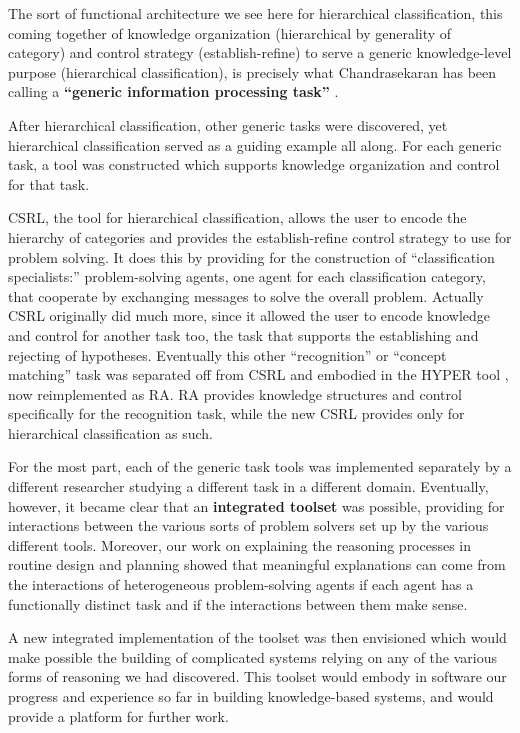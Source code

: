 The sort of functional architecture we see here for hierarchical
classification, this coming together of knowledge organization
(hierarchical by generality of category) and control strategy
(establish-refine) to serve a generic knowledge-level purpose
(hierarchical classification), is precisely what Chandrasekaran has
been calling a {\bf ``generic information processing task''}
\cite{86-BC-IEEEX,87-BC-IJCAI}.

After hierarchical classification, other generic tasks were
discovered, yet hierarchical classification served as a guiding
example all along.  For each generic task, a tool was constructed
which supports knowledge organization and control for that task.

CSRL, the tool for hierarchical classification, allows the user to
encode the hierarchy of categories and provides the establish-refine
control strategy to use for problem solving.  It does this by
providing for the construction of ``classification specialists:''
problem-solving agents, one agent for each classification category,
that cooperate by exchanging messages to solve the overall problem.
Actually CSRL originally did much more, since it allowed the user to
encode knowledge and control for another task too, the task that
supports the establishing and rejecting of hypotheses.  Eventually
this other ``recognition'' or ``concept matching'' task was separated
off from CSRL and embodied in the HYPER tool \cite{Johnson86}, now
reimplemented as RA.  RA provides knowledge structures and control
specifically for the recognition task, while the new CSRL provides
only for hierarchical classification as such.

For the most part, each of the generic task tools was implemented
separately by a different researcher studying a different task in a
different domain.  Eventually, however, it became clear that an {\bf
integrated toolset} was possible, providing for interactions between
the various sorts of problem solvers set up by the various different
tools.  Moreover, our work on explaining the reasoning processes in
routine design and planning \cite{86-BC-EXPCON} showed that meaningful
explanations can come from the interactions of heterogeneous
problem-solving agents if each agent has a functionally distinct task
and if the interactions between them make sense.

A new integrated implementation of the toolset was then envisioned
which would make possible the building of complicated systems relying
on any of the various forms of reasoning we had discovered.  This
toolset would embody in software our progress and experience so far in
building knowledge-based systems, and would provide a platform for
further work.

